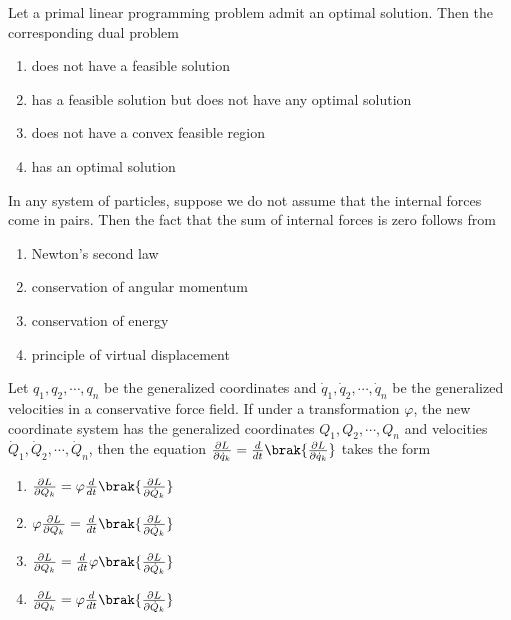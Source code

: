 \iffalse
\author{EE24BTECH11047}
\section{ma}
\chapter{2008}
\fi

\item Let a primal linear programming problem admit an optimal solution. Then the corresponding dual problem
    \begin{enumerate}
        \item does not have a feasible solution
        \item has a feasible solution but does not have any optimal solution
        \item does not have a convex feasible region
        \item has an optimal solution
    \end{enumerate}
\item In any system of particles, suppose we do not assume that the internal forces come in pairs. Then the fact that the sum of internal forces is zero follows from
    \begin{enumerate}
        \item Newton's second law
        \item conservation of angular momentum
        \item conservation of energy
        \item principle of virtual displacement
    \end{enumerate}
\item Let $q_1, q_2, \cdots, q_n$ be the generalized coordinates and $\dot{q}_1, \dot{q}_2, \cdots, \dot{q}_n$ be the generalized velocities in a conservative force field. If under a transformation $\varphi$, the new coordinate system has the generalized coordinates $Q_1, Q_2, \cdots, Q_n$ and velocities $\dot{Q}_1, \dot{Q}_2, \cdots, \dot{Q}_n$, then the equation $\frac{\partial L}{\partial \dot{q}_k} = \frac{d}{dt} \brak{\frac{\partial L}{\partial \dot{q}_k}}$
takes the form
    \begin{enumerate}
        \item $\frac{\partial L}{\partial Q_k} = \varphi \frac{d}{dt} \brak{\frac{\partial L}{\partial \dot{Q}_k}}$
        \item $\varphi \frac{\partial L}{\partial Q_k} = \frac{d}{dt} \brak{\frac{\partial L}{\partial \dot{Q}_k}}$
        \item $\frac{\partial L}{\partial Q_k} = \frac{d}{dt} \varphi \brak{\frac{\partial L}{\partial \dot{Q}_k}}$
        \item $\frac{\partial L}{\partial Q_k} = \varphi \frac{d}{dt} \brak{\frac{\partial L}{\partial \dot{Q}_k}}$
    \end{enumerate}
